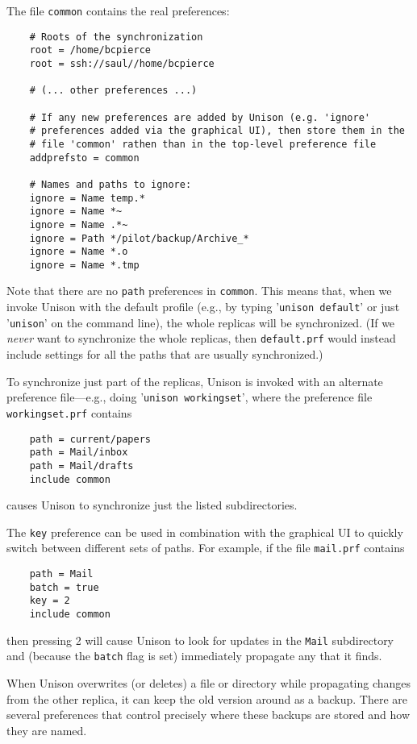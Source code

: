 \documentclass{article}
\begin{document}
The file {\tt common} contains the real preferences:
\begin{verbatim}
    # Roots of the synchronization
    root = /home/bcpierce
    root = ssh://saul//home/bcpierce

    # (... other preferences ...)

    # If any new preferences are added by Unison (e.g. 'ignore'
    # preferences added via the graphical UI), then store them in the
    # file 'common' rathen than in the top-level preference file
    addprefsto = common

    # Names and paths to ignore:
    ignore = Name temp.*
    ignore = Name *~
    ignore = Name .*~
    ignore = Path */pilot/backup/Archive_*
    ignore = Name *.o
    ignore = Name *.tmp
\end{verbatim}
Note that there are no {\tt path} preferences in {\tt common}.  This
means that, when we invoke Unison with the default profile (e.g., by
typing '{\tt unison default}' or just '{\tt unison}' on the command
line), the whole replicas will be synchronized.  (If we {\em never} want
to synchronize the whole replicas, then {\tt default.prf} would instead
include settings for all the paths that are usually synchronized.)

To synchronize just part of the replicas, Unison is invoked with an
alternate preference file---e.g., doing '{\tt unison workingset}', where the
preference file {\tt workingset.prf} contains
\begin{verbatim}
    path = current/papers
    path = Mail/inbox
    path = Mail/drafts
    include common
\end{verbatim}
causes Unison to synchronize just the listed subdirectories.

The {\tt key} preference can be used in combination with the graphical UI
to quickly switch between different sets of paths.  For example, if the
file {\tt mail.prf} contains
\begin{verbatim}
    path = Mail
    batch = true
    key = 2
    include common
\end{verbatim}
then pressing 2 will cause Unison to look for updates in the {\tt Mail}
subdirectory and (because the {\tt batch} flag is set) immediately
propagate any that it finds.



When Unison overwrites (or deletes) a file or directory while propagating changes from
the other replica, it can keep the old version around as a backup.  There
are several preferences that control precisely where these backups are
stored and how they are named.
\end{document}
